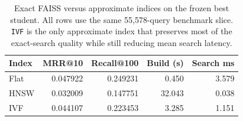 \begin{table}[H]
\centering
\footnotesize
\renewcommand{\arraystretch}{1.05}
\caption{Exact FAISS versus approximate indices on the frozen best student. All rows use the same 55{,}578-query benchmark slice. \texttt{IVF} is the only approximate index that preserves most of the exact-search quality while still reducing mean search latency.}
\label{tab:ann-results}
\setlength{\tabcolsep}{3.2pt}
\begin{tabular}{@{}lrrrr@{}}
\toprule
Index & MRR@10 & Recall@100 & Build (s) & Search ms \\
\midrule
Flat & 0.047922 & 0.249231 & 0.450 & 3.579 \\
HNSW & 0.032009 & 0.147751 & 32.043 & 0.038 \\
IVF & 0.044107 & 0.223453 & 3.285 & 1.151 \\
\bottomrule
\end{tabular}
\end{table}
